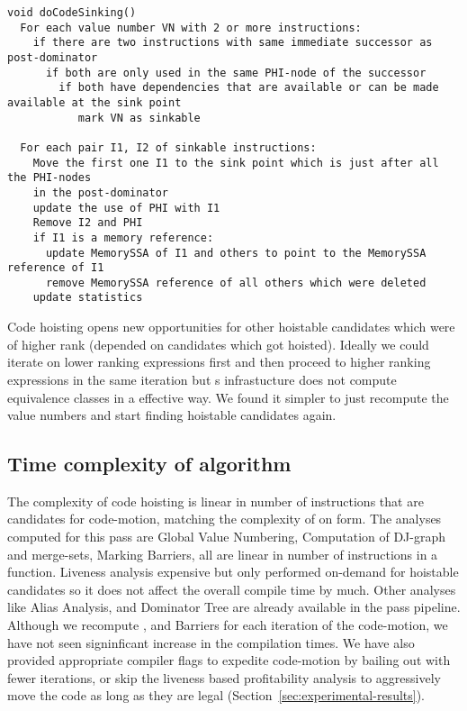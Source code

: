 \documentclass[acmlarge,review,anonymous]{acmart}\settopmatter{printfolios=true}
\begin{document}
\begin{verbatim}
void doCodeSinking()
  For each value number VN with 2 or more instructions:
    if there are two instructions with same immediate successor as post-dominator
      if both are only used in the same PHI-node of the successor
        if both have dependencies that are available or can be made available at the sink point
           mark VN as sinkable

  For each pair I1, I2 of sinkable instructions:
    Move the first one I1 to the sink point which is just after all the PHI-nodes
    in the post-dominator
    update the use of PHI with I1
    Remove I2 and PHI
    if I1 is a memory reference:
      update MemorySSA of I1 and others to point to the MemorySSA reference of I1
      remove MemorySSA reference of all others which were deleted
    update statistics

\end{verbatim}

Code hoisting opens new opportunities for other hoistable candidates which were
of higher rank (depended on candidates which got hoisted). Ideally we could
iterate on lower ranking expressions first and then proceed to higher ranking
expressions in the same iteration but s \GVN{} infrastucture does not
compute equivalence classes in a effective way. We found it simpler to just
recompute the value numbers and start finding hoistable candidates again.

\subsection{Time complexity of algorithm}
The complexity of code hoisting is linear in number of instructions that are
candidates for code-motion, matching the complexity of \PRE{} on \SSA{} form.
The analyses computed for this pass are Global Value Numbering, Computation of
DJ-graph and merge-sets, Marking Barriers, all are linear in number of
instructions in a function. Liveness analysis expensive but only performed
on-demand for hoistable candidates so it does not affect the overall compile
time by much. Other analyses like Alias Analysis, \MemorySSA{} and Dominator Tree
are already available in the \LLVM{} pass pipeline. Although we recompute \GVN{}, and
Barriers for each iteration of the code-motion, we have not seen signinficant
increase in the compilation times. We have also provided appropriate compiler
flags to expedite code-motion by bailing out with fewer iterations, or skip the
liveness based profitability analysis to aggressively move the code as long as
they are legal (Section~\ref{sec:experimental-results}).
\end{document}
